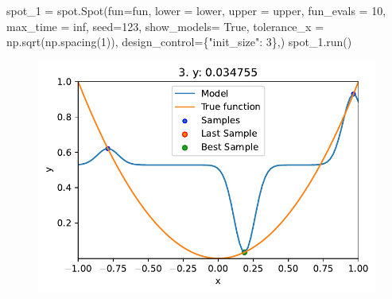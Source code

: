 \documentclass[
  letterpaper,
  DIV=11,
  numbers=noendperiod]{scrreprt}
\newenvironment{Shaded}{\begin{snugshade}}{\end{snugshade}}
\newcommand{\DecValTok}[1]{\textcolor[rgb]{0.68,0.00,0.00}{#1}}
\newcommand{\NormalTok}[1]{\textcolor[rgb]{0.00,0.23,0.31}{#1}}
\newcommand{\OperatorTok}[1]{\textcolor[rgb]{0.37,0.37,0.37}{#1}}
\newcommand{\StringTok}[1]{\textcolor[rgb]{0.13,0.47,0.30}{#1}}
\newcommand{\VariableTok}[1]{\textcolor[rgb]{0.07,0.07,0.07}{#1}}
\begin{document}
\begin{Shaded}
\begin{Highlighting}[]
\NormalTok{spot\_1 }\OperatorTok{=}\NormalTok{ spot.Spot(fun}\OperatorTok{=}\NormalTok{fun,}
\NormalTok{                   lower }\OperatorTok{=}\NormalTok{ lower,}
\NormalTok{                   upper }\OperatorTok{=}\NormalTok{ upper,}
\NormalTok{                   fun\_evals }\OperatorTok{=} \DecValTok{10}\NormalTok{,}
\NormalTok{                   max\_time }\OperatorTok{=}\NormalTok{ inf,}
\NormalTok{                   seed}\OperatorTok{=}\DecValTok{123}\NormalTok{,}
\NormalTok{                   show\_models}\OperatorTok{=} \VariableTok{True}\NormalTok{,}
\NormalTok{                   tolerance\_x }\OperatorTok{=}\NormalTok{ np.sqrt(np.spacing(}\DecValTok{1}\NormalTok{)),}
\NormalTok{                   design\_control}\OperatorTok{=}\NormalTok{\{}\StringTok{"init\_size"}\NormalTok{: }\DecValTok{3}\NormalTok{\},)}
\NormalTok{spot\_1.run()}
\end{Highlighting}
\end{Shaded}

\begin{figure}[H]

{\centering \includegraphics{04_spot_sklearn_surrogate_files/figure-pdf/cell-21-output-1.pdf}

}

\end{figure}
\end{document}
